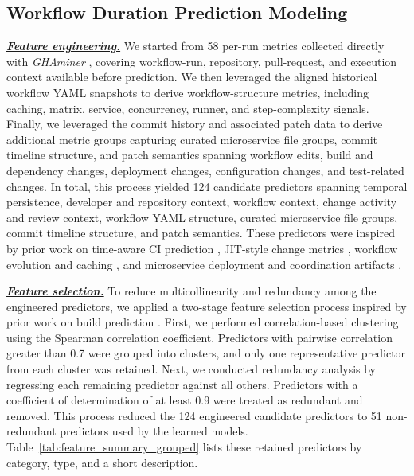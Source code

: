 \documentclass[conference]{IEEEconf}
\begin{document}
\subsection{Workflow Duration Prediction Modeling}
\noindent\underline{\textbf{\textit{Feature engineering.}}} We started from 58 per-run metrics collected directly with \textit{GHAminer} \cite{ghaminer}, covering workflow-run, repository, pull-request, and execution context available before prediction. We then leveraged the aligned historical workflow YAML snapshots to derive workflow-structure metrics, including caching, matrix, service, concurrency, runner, and step-complexity signals. Finally, we leveraged the commit history and associated patch data to derive additional metric groups capturing curated microservice file groups, commit timeline structure, and patch semantics spanning workflow edits, build and dependency changes, deployment changes, configuration changes, and test-related changes. In total, this process yielded 124 candidate predictors spanning temporal persistence, developer and repository context, workflow context, change activity and review context, workflow YAML structure, curated microservice file groups, commit timeline structure, and patch semantics. These predictors were inspired by prior work on time-aware CI prediction \cite{Atchison2017TravisTimeSeries,Saidani2020BuildFailureSearch,Wu2022DockerBuildDuration}, JIT-style change metrics \cite{Kamei2013JITQA,Saidani2020BuildFailureSearch}, workflow evolution and caching \cite{RostamiMazrae2026WorkflowEvolution,Hasan2026CachingEvolution}, and microservice deployment and coordination artifacts \cite{taibi2019continuous,karabey2021deployment,baresi2022docker,reile2022bunk8s,waseem2022decision}.

\noindent\underline{\textbf{\textit{Feature selection.}}} To reduce multicollinearity and redundancy among the engineered predictors, we applied a two-stage feature selection process inspired by prior work on build prediction \cite{Saidani2020BuildFailureSearch,Wu2022DockerBuildDuration}. First, we performed correlation-based clustering using the Spearman correlation coefficient. Predictors with pairwise correlation greater than 0.7 were grouped into clusters, and only one representative predictor from each cluster was retained. Next, we conducted redundancy analysis by regressing each remaining predictor against all others. Predictors with a coefficient of determination of at least 0.9 were treated as redundant and removed. This process reduced the 124 engineered candidate predictors to 51 non-redundant predictors used by the learned models. Table~\ref{tab:feature_summary_grouped} lists these retained predictors by category, type, and a short description.
\end{document}
